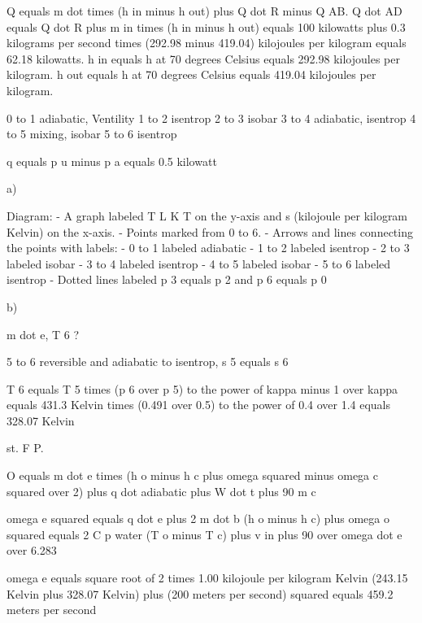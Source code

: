Q equals m dot times (h in minus h out) plus Q dot R minus Q AB. Q dot AD equals Q dot R plus m in times (h in minus h out) equals 100 kilowatts plus 0.3 kilograms per second times (292.98 minus 419.04) kilojoules per kilogram equals 62.18 kilowatts. h in equals h at 70 degrees Celsius equals 292.98 kilojoules per kilogram. h out equals h at 70 degrees Celsius equals 419.04 kilojoules per kilogram.

0 to 1 adiabatic, Ventility  
1 to 2 isentrop  
2 to 3 isobar  
3 to 4 adiabatic, isentrop  
4 to 5 mixing, isobar  
5 to 6 isentrop  

q equals p u minus p a equals 0.5 kilowatt  

a)  

Diagram:  
- A graph labeled T L K T on the y-axis and s (kilojoule per kilogram Kelvin) on the x-axis.  
- Points marked from 0 to 6.  
- Arrows and lines connecting the points with labels:  
  - 0 to 1 labeled adiabatic  
  - 1 to 2 labeled isentrop  
  - 2 to 3 labeled isobar  
  - 3 to 4 labeled isentrop  
  - 4 to 5 labeled isobar  
  - 5 to 6 labeled isentrop  
- Dotted lines labeled p 3 equals p 2 and p 6 equals p 0  

b)  

m dot e, T 6 ?  

5 to 6 reversible and adiabatic to isentrop, s 5 equals s 6  

T 6 equals T 5 times (p 6 over p 5) to the power of kappa minus 1 over kappa equals 431.3 Kelvin times (0.491 over 0.5) to the power of 0.4 over 1.4 equals 328.07 Kelvin  

st. F P.  

O equals m dot e times (h o minus h c plus omega squared minus omega c squared over 2) plus q dot adiabatic plus W dot t plus 90 m c  

omega e squared equals q dot e plus 2 m dot b (h o minus h c) plus omega o squared equals 2 C p water (T o minus T c) plus v in plus 90 over omega dot e over 6.283  

omega e equals square root of 2 times 1.00 kilojoule per kilogram Kelvin (243.15 Kelvin plus 328.07 Kelvin) plus (200 meters per second) squared equals 459.2 meters per second